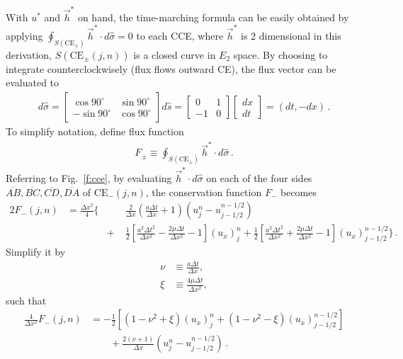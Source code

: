 \documentclass[11pt,dvips]{article}
\renewcommand{\figurename}{Fig.}
\numberwithin{equation}{section}
\begin{document}
With $u^*$ and $\vec{h}^*$ on hand, the time-marching formula can be easily
obtained by applying $\oint_{S(\mathrm{CE}_{\pm})}\vec{h}^*\cdot
d\hat{\sigma}=0$ to each CCE, where $\vec{h}^*$ is 2 dimensional in this
derivation, $S(\mathrm{CE}_{\pm}(j,n))$ is a closed curve in $E_2$ space.  By
choosing to integrate counterclockwisely (flux flows outward CE), the flux
vector can be evaluated to
\begin{align*}
  d\hat{\sigma}
  = \left[\begin{array}{cc} \cos90^{\circ} & \sin90^{\circ} \\
                           -\sin90^{\circ} & \cos90^{\circ}
    \end{array}\right] d\hat{s}
  = \left[\begin{array}{cc} 0 & 1 \\
                           -1 & 0
    \end{array}\right]
    \left[\begin{array}{c} dx \\ dt
    \end{array}\right]
  = (dt, -dx) \,.
\end{align*}
To simplify notation, define flux function
\begin{align*}
  F_{\pm} \equiv
    \oint_{S(\mathrm{CE}_{\pm})}\vec{h}^*\cdot d\hat{\sigma} \,.
\end{align*}
Referring to \figurename~\ref{f:cce}, by evaluating $\vec{h}^*\cdot
d\hat{\sigma}$ on each of the four sides $\overline{AB}, \overline{BC},
\overline{CD}, \overline{DA}$ of $\mathrm{CE}_-(j,n)$, the conservation
function $F_-$ becomes
\begin{alignat*}{2}
  F_-(j,n) &= \frac{\Delta x^2}{4}\Big\{
    &&\frac{2}{\Delta x}\left(\frac{a\Delta t}{\Delta x}+1\right)
      \left(u_j^n-u_{j-1/2}^{n-1/2}\right) \\
  & &+\;& \frac{1}{2}\left[
          \frac{a^2\Delta t^2}{\Delta x^2}
        - \frac{2\mu\Delta t} {\Delta x^2} - 1
        \right](u_x)_j^n
    +     \frac{1}{2}\left[
          \frac{a^2\Delta t^2}{\Delta x^2}
        + \frac{2\mu\Delta t} {\Delta x^2} - 1
        \right](u_x)_{j-1/2}^{n-1/2}
    \Big\}\,.
\end{alignat*}
Simplify it by
\begin{align}
  \nu &\equiv \frac{a\Delta t}{\Delta x}, \label{e:nu} \\
  \xi &\equiv \frac{4\mu\Delta t}{\Delta x^2}, \label{e:xi}
\end{align}
such that
\begin{align*}
  \frac{4}{\Delta x^2}F_-(j,n) &=
    -\frac{1}{2}\left[
      (1-\nu^2+\xi)(u_x)_j^n + (1-\nu^2-\xi)(u_x)_{j-1/2}^{n-1/2}
    \right] \\
  &\quad\quad
  + \frac{2(\nu+1)}{\Delta x}\left(u_j^n-u_{j-1/2}^{n-1/2}\right) \,.
\end{align*}
\end{document}
